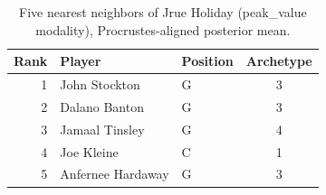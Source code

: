 \begin{table}[htbp]
  \centering\small
  \begin{tabular}{rllc}
    \toprule
    Rank & Player & Position & Archetype \\
    \midrule
    1 & John Stockton & G & 3 \\
    2 & Dalano Banton & G & 3 \\
    3 & Jamaal Tinsley & G & 4 \\
    4 & Joe Kleine & C & 1 \\
    5 & Anfernee Hardaway & G & 3 \\
    \bottomrule
  \end{tabular}
  \caption{Five nearest neighbors of Jrue Holiday (peak_value modality), Procrustes-aligned posterior mean.}
  \label{tab:Jrue_Holiday_neighbors_peak_value}
\end{table}

